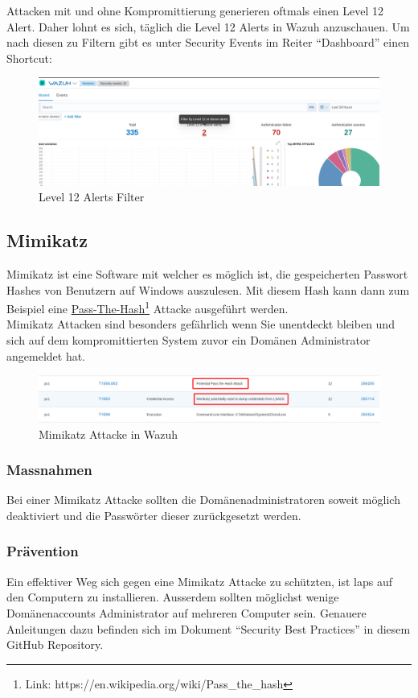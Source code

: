 Attacken mit und ohne Kompromittierung generieren oftmals einen Level 12 Alert. Daher lohnt es sich, täglich die Level 12 Alerts in Wazuh anzuschauen.
Um nach diesen zu Filtern gibt es unter Security Events im Reiter ``Dashboard'' einen Shortcut:
\begin{figure}[H]
    \centering
    \includegraphics[width=\linewidth]{../img/filter-by-level12.png}
    \caption{Level 12 Alerts Filter}
\end{figure}


\subsection{Mimikatz}
Mimikatz ist eine Software mit welcher es möglich ist, die gespeicherten Passwort Hashes von Benutzern auf Windows auszulesen.
Mit diesem Hash kann dann zum Beispiel eine \href{https://en.wikipedia.org/wiki/Pass\_the\_hash}{Pass-The-Hash}\footnote{Link: https://en.wikipedia.org/wiki/Pass\_the\_hash} Attacke ausgeführt werden.\\

Mimikatz Attacken sind besonders gefährlich wenn Sie unentdeckt bleiben und sich auf dem kompromittierten System zuvor ein Domänen Administrator angemeldet hat.
\begin{figure}[H]
    \centering
    \includegraphics[width=\linewidth]{../img/mimikatz.png}
    \caption{Mimikatz Attacke in Wazuh}
\end{figure}

\subsubsection{Massnahmen}
Bei einer Mimikatz Attacke sollten die Domänenadministratoren soweit möglich deaktiviert und die Passwörter dieser zurückgesetzt werden.

\subsubsection{Prävention}
Ein effektiver Weg sich gegen eine Mimikatz Attacke zu schützten, ist \acrshort{laps} auf den Computern zu installieren. 
Ausserdem sollten möglichst wenige Domänenaccounts Administrator auf mehreren Computer sein.
Genauere Anleitungen dazu befinden sich im Dokument ``Security Best Practices'' in diesem GitHub Repository.

